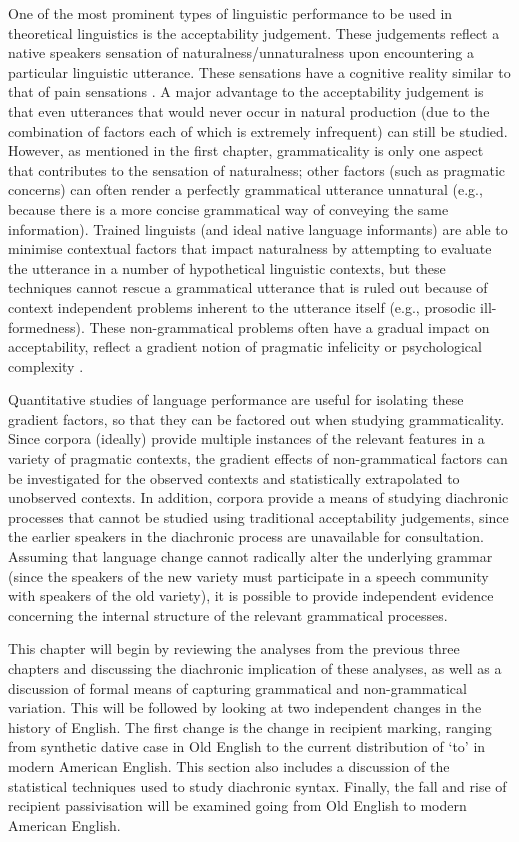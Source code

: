 One of the most prominent types of linguistic performance to be used in theoretical linguistics is the acceptability judgement. These judgements reflect a native speakers sensation of naturalness/unnaturalness upon encountering a particular linguistic utterance. These sensations have a cognitive reality similar to that of pain sensations \citep{Schutze.2014}. A major advantage to the acceptability judgement is that even utterances that would never occur in natural production (due to the combination of factors each of which is extremely infrequent) can still be studied. However, as mentioned in the first chapter, grammaticality is only one aspect that contributes to the sensation of naturalness; other factors (such as pragmatic concerns) can often render a perfectly grammatical utterance unnatural (e.g., because there is a more concise grammatical way of conveying the same information). Trained linguists (and ideal native language informants) are able to minimise contextual factors that impact naturalness by attempting to evaluate the utterance in a number of hypothetical linguistic contexts, but these techniques cannot rescue a grammatical utterance that is ruled out because of context independent problems inherent to the utterance itself (e.g., prosodic ill-formedness). These non-grammatical problems often have a gradual impact on acceptability, reflect a gradient notion of pragmatic infelicity or psychological complexity \citep{Bresnan.2007,Bresnan.2010,Schutze.2014}.

Quantitative studies of language performance are useful for isolating these gradient factors, so that they can be factored out when studying grammaticality. Since corpora (ideally) provide multiple instances of the relevant features in a variety of pragmatic contexts, the gradient effects of non-grammatical factors can be investigated for the observed contexts and statistically extrapolated to unobserved contexts. In addition, corpora provide a means of studying diachronic processes that cannot be studied using traditional acceptability judgements, since the earlier speakers in the diachronic process are unavailable for consultation. Assuming that language change cannot radically alter the underlying grammar (since the speakers of the new variety must participate in a speech community with speakers of the old variety), it is possible to provide independent evidence concerning the internal structure of the relevant grammatical processes.

This chapter will begin by reviewing the analyses from the previous three chapters and discussing the diachronic implication of these analyses, as well as a discussion of formal means of capturing grammatical and non-grammatical variation. This will be followed by looking at two independent changes in the history of English. The first change is the change in recipient marking, ranging from synthetic dative case in Old English to the current distribution of `to' in modern American English. This section also includes a discussion of the statistical techniques used to study diachronic syntax. Finally, the fall and rise of recipient passivisation will be examined going from Old English to modern American English.

